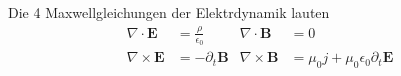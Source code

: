 Die 4 Maxwellgleichungen der Elektrdynamik lauten
\begin{align}
  \nabla \cdot \symbf{E} &= \frac{\rho}{\epsilon_{0}} &
  \nabla \cdot \symbf{B} &= 0\\
  \nabla \times \symbf{E} &= -\partial_{t}\symbf{B} &
  \nabla \times \symbf{B} &= \mu_{0} j + \mu_{0} \epsilon_{0}
  \partial_{t} \symbf{E}
\end{align}

